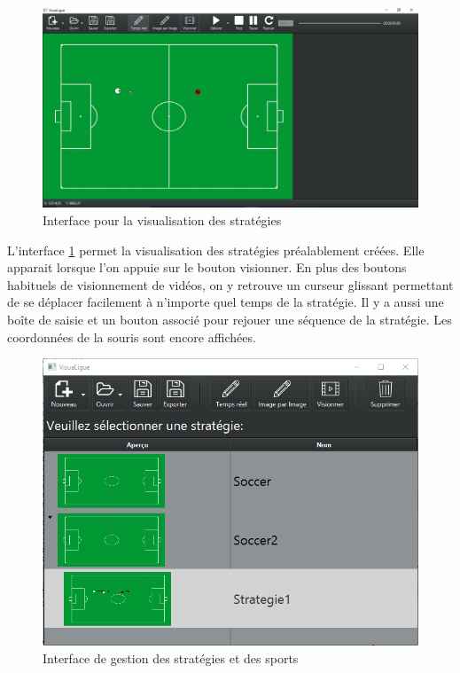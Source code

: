 \begin{figure}[htpb]
    \centering
    \includegraphics[scale=0.5]{fig/gui/mediaContent.png}
    \caption{Interface pour la visualisation des stratégies}
    \label{fig:gui:mediaContent}
\end{figure}

L'interface \ref{fig:gui:mediaContent} permet la visualisation des stratégies préalablement créées.
Elle apparait lorsque l'on appuie sur le bouton visionner.
En plus des boutons habituels de visionnement de vidéos, on y retrouve un curseur glissant permettant de se déplacer facilement à n'importe quel temps de la stratégie.
Il y a aussi une boîte de saisie et un bouton associé pour rejouer une séquence de la stratégie.
Les coordonnées de la souris sont encore affichées.

\begin{figure}[htpb]
    \centering
    \includegraphics[scale=0.6]{fig/gui/openStrategy.png}
    \caption{Interface de gestion des stratégies et des sports}
    \label{fig:gui:openStrategy}
\end{figure}

